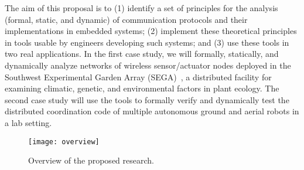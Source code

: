 The aim of this proposal is to (1) identify a set of principles for the analysis (formal, static,
  and dynamic) of communication protocols and
  their implementations in embedded systems; (2) implement these theoretical principles in tools usable by
  engineers developing such systems; and (3) use these tools in two real applications.
  In the first case study, we will formally, statically, and dynamically analyze networks
  of wireless sensor/actuator nodes deployed in the Southwest Experimental Garden
  Array (SEGA)~\cite{YamEtAl10,FliEtAl12}, a distributed facility for
  examining climatic, genetic, and environmental factors in plant ecology.
  The second case study will use the tools to formally verify and dynamically test the distributed coordination code of multiple autonomous ground and aerial robots in a lab setting.


\begin{figure}[!t]
  \centering
  \texttt{[image: overview]}
  \caption{Overview of the proposed research.}
  \label{fig:overview}
\end{figure}

